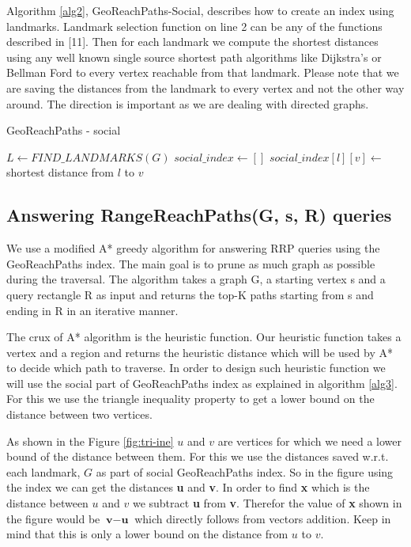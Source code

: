 {Algorithm \ref{alg2}, GeoReachPaths-Social, describes how to create an index using landmarks. Landmark selection function on line 2 can be any of the functions described in [11]. Then for each landmark we compute the shortest distances using any well known single source shortest path algorithms like Dijkstra's or Bellman Ford to every vertex reachable from that landmark. Please note that we are saving the distances from the landmark to every vertex and not the other way around. The direction is important as we are dealing with directed graphs.\\

\begin{algorithm}[t]
\caption{GeoReachPaths - social}
\label{alg2}
\begin{algorithmic}[1]

  \State $L \gets FIND\_LANDMARKS(G)$ 
  \State $social\_index \gets []$
	  	\State $social\_index[l][v] \gets $ shortest distance from $l$ to $v$
	\EndFor
  \EndFor
\EndFunction
\end{algorithmic}
\end{algorithm}

\subsection{Answering RangeReachPaths(G, s, R) queries} \label{querying}

We use a modified A* greedy algorithm for answering RRP queries using the GeoReachPaths index. The main goal is to prune as much graph as possible during the traversal. The algorithm takes a graph G, a starting vertex s and a query rectangle R as input and returns the top-K paths starting from s and ending in R in an iterative manner.

The crux of A* algorithm is the heuristic function. Our heuristic function takes a vertex and a region and returns the heuristic distance which will be used by A* to decide which path to traverse. In order to design such heuristic function we will use the social part of GeoReachPaths index as explained in algorithm \ref{alg3}. For this we use the triangle inequality property to get a lower bound on the distance between two vertices.

As shown in the Figure \ref{fig:tri-ine} $u$ and $v$ are vertices for which we need a lower bound of the distance between them. For this we use the distances saved w.r.t. each landmark, $G$ as part of social GeoReachPaths index. So in the figure using the index we can get the distances \textbf{u} and \textbf{v}. In order to find \textbf{x} which is the distance between $u$ and $v$ we subtract \textbf{u} from \textbf{v}. Therefor the value of \textbf{x} shown in the figure would be $\textbf{v} - \textbf{u}$ which directly follows from vectors addition. Keep in mind that this is only a lower bound on the distance from $u$ to $v$.

}
